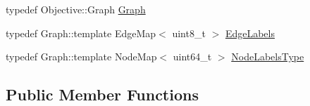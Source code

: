 \begin{DoxyCompactItemize}
\item 
typedef Objective\+::\+Graph \hyperlink{classnifty_1_1graph_1_1optimization_1_1multicut_1_1PyMulticutBase_a215eb2e3f8b280cebd5b3e78a9cbc490}{Graph}
\item 
typedef Graph\+::template Edge\+Map$<$ uint8\+\_\+t $>$ \hyperlink{classnifty_1_1graph_1_1optimization_1_1multicut_1_1PyMulticutBase_a2d5a888ced0b0d9a6e474a775fa23ddc}{Edge\+Labels}
\item 
typedef Graph\+::template Node\+Map$<$ uint64\+\_\+t $>$ \hyperlink{classnifty_1_1graph_1_1optimization_1_1multicut_1_1PyMulticutBase_a3fa8b01c434939d8187dc7b1515f4d81}{Node\+Labels\+Type}
\end{DoxyCompactItemize}
\subsection*{Public Member Functions}
